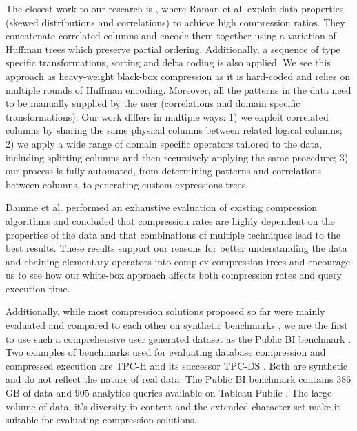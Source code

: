 The closest work to our research is \cite{raman2006wring}, where Raman et al. exploit data properties (skewed distributions and correlations) to achieve high compression ratios. They concatenate correlated columns and encode them together using a variation of Huffman trees which preserve partial ordering. Additionally, a sequence of type specific transformations, sorting and delta coding is also applied. We see this approach as heavy-weight black-box compression as it is hard-coded and relies on multiple rounds of Huffman encoding. Moreover, all the patterns in the data need to be manually supplied by the user (correlations and domain specific transformations). Our work differs in multiple ways: 1) we exploit correlated columns by sharing the same physical columns between related logical columns; 2) we apply a wide range of domain specific operators tailored to the data, including splitting columns and then recursively applying the same procedure; 3) our process is fully automated, from determining patterns and correlations between columns, to generating custom expressions trees.

Damme et al. \cite{damme2017lightweight} performed an exhaustive evaluation of existing compression algorithms and concluded that compression rates are highly dependent on the properties of the data and that combinations of multiple techniques lead to the best results. These results support our reasons for better understanding the data and chaining elementary operators into complex compression trees and encourage us to see how our white-box approach affects both compression rates and query execution time.

Additionally, while most compression solutions proposed so far were mainly evaluated and compared to each other on synthetic benchmarks \cite{abadi2006integrating,zukowski2006super,lee2014joins,lang2016data,raman2013db2}, we are the first to use such a comprehensive user generated dataset as the Public BI benchmark \cite{pbib}. Two examples of benchmarks used for evaluating database compression and compressed execution are TPC-H \cite{boncz2013tpc} and its successor TPC-DS \cite{nambiar2006making}. Both are synthetic and do not reflect the nature of real data. The Public BI benchmark contains 386 GB of data and 905 analytics queries available on Tableau Public \cite{vogelsgesang2018get, tableaupublic}. The large volume of data, it’s diversity in content and the extended character set make it suitable for evaluating compression solutions.


